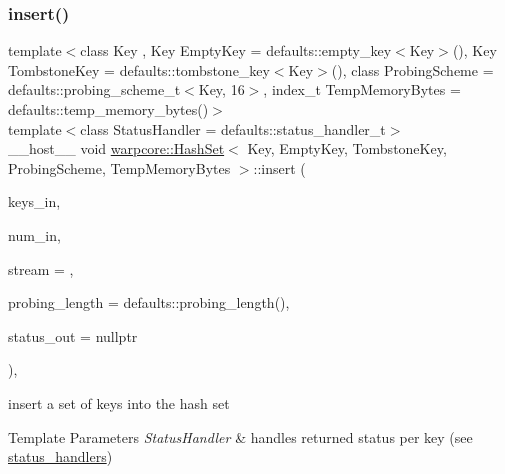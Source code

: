 \subsubsection{\texorpdfstring{insert()}{insert()}\hspace{0.1cm}{\footnotesize\ttfamily [2/2]}}
{\footnotesize\ttfamily template$<$class Key , Key Empty\+Key = defaults\+::empty\+\_\+key$<$\+Key$>$(), Key Tombstone\+Key = defaults\+::tombstone\+\_\+key$<$\+Key$>$(), class Probing\+Scheme  = defaults\+::probing\+\_\+scheme\+\_\+t$<$\+Key, 16$>$, index\+\_\+t Temp\+Memory\+Bytes = defaults\+::temp\+\_\+memory\+\_\+bytes()$>$ \\
template$<$class Status\+Handler  = defaults\+::status\+\_\+handler\+\_\+t$>$ \\
\+\_\+\+\_\+host\+\_\+\+\_\+ void \hyperlink{classwarpcore_1_1HashSet}{warpcore\+::\+Hash\+Set}$<$ Key, Empty\+Key, Tombstone\+Key, Probing\+Scheme, Temp\+Memory\+Bytes $>$\+::insert (\begin{DoxyParamCaption}\item[{key\+\_\+type $\ast$}]{keys\+\_\+in,  }\item[{index\+\_\+type}]{num\+\_\+in,  }\item[{cuda\+Stream\+\_\+t}]{stream = {},  }\item[{index\+\_\+type}]{probing\+\_\+length = {\ttfamily defaults\+:\+:probing\+\_\+length()},  }\item[{typename Status\+Handler\+::base\+\_\+type $\ast$}]{status\+\_\+out = {\ttfamily nullptr} }\end{DoxyParamCaption})\hspace{0.3cm}{\ttfamily [inline]}, {\ttfamily [noexcept]}}



insert a set of keys into the hash set 


\begin{DoxyTemplParams}{Template Parameters}
{\em Status\+Handler} & handles returned status per key (see {\ttfamily \hyperlink{namespacewarpcore_1_1status__handlers}{status\+\_\+handlers}}) \\
\hline
\end{DoxyTemplParams}


